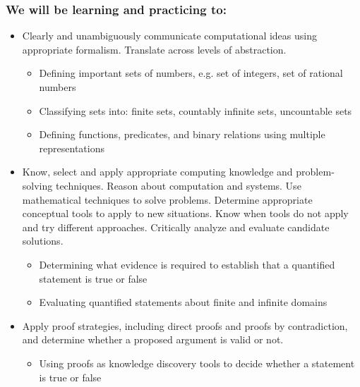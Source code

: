 \subsubsection*{We will be learning and practicing to:}
\begin{itemize}

\item Clearly and unambiguously communicate computational ideas using appropriate formalism. Translate across levels of abstraction.
\begin{itemize}
    \item Defining important sets of numbers, e.g. set of integers, set of rational numbers
    \item Classifying sets into: finite sets, countably infinite sets, uncountable sets
    \item Defining functions, predicates, and binary relations using multiple representations
\end{itemize}

\item Know, select and apply appropriate computing knowledge and problem-solving techniques. Reason about computation and systems. Use mathematical techniques to solve problems. Determine appropriate conceptual tools to apply to new situations. Know when tools do not apply and try different approaches. Critically analyze and evaluate candidate solutions.
\begin{itemize}
    \item Determining what evidence is required to establish that a quantified statement is true or false
    \item Evaluating quantified statements about finite and infinite domains
\end{itemize}

\item Apply proof strategies, including direct proofs and proofs by contradiction, and determine whether a proposed argument is valid or not.
\begin{itemize}
    \item Using proofs as knowledge discovery tools to decide whether a statement is true or false
\end{itemize}
\end{itemize}

